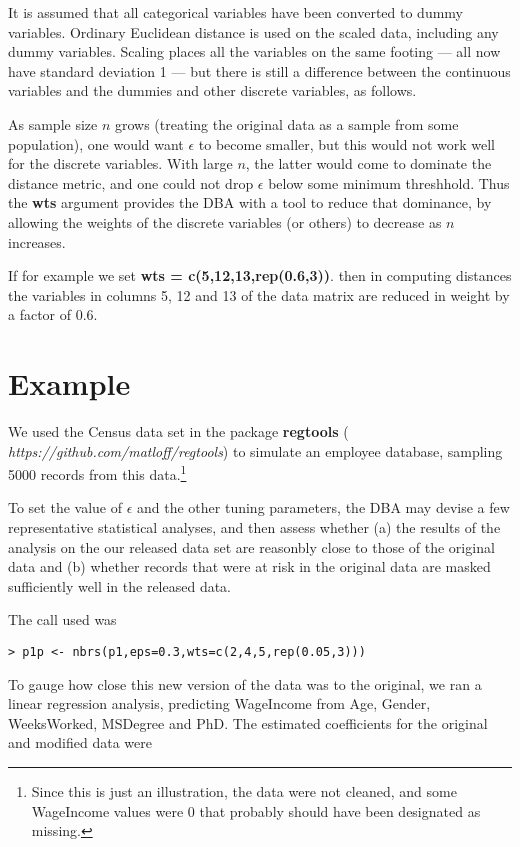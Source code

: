 \documentclass[11pt]{article}
\begin{document}
It is assumed that all categorical variables have been converted to
dummy variables.  Ordinary Euclidean distance is used on the scaled
data, including any dummy variables.  Scaling places all the variables
on the same footing --- all now have standard deviation 1 --- but there
is still a difference between the continuous variables and the dummies
and other discrete variables, as follows.

As sample size $n$ grows (treating the original data as a sample from
some population), one would want $\epsilon$ to become smaller, but this
would not work well for the discrete variables.  With large $n$, the
latter would come to dominate the distance metric, and one could not
drop $\epsilon$ below some minimum threshhold.  Thus the {\bf wts}
argument provides the DBA with a tool to reduce that dominance, by
allowing the weights of the discrete variables (or others) to decrease
as $n$ increases.

If for example we set {\bf wts = c(5,12,13,rep(0.6,3))}. then in
computing distances the variables in columns 5, 12 and 13 of the data
matrix are reduced in weight by a factor of 0.6.  

\section{Example}

We used the Census data set in the package {\bf regtools} ({\it
https://github.com/matloff/regtools}) to simulate an employee
database, sampling 5000 records from this data.\footnote{Since this is
just an illustration, the data were not cleaned, and some WageIncome
values were 0 that probably should have been designated as missing.}

To set the value of $\epsilon$ and the other tuning parameters, the DBA
may devise a few representative statistical analyses, and then assess
whether (a) the results of the analysis on the our released data set are
reasonbly close to those of the original data and (b) whether records
that were at risk in the original data are masked sufficiently well in
the released data.

The call used was

\begin{lstlisting}
> p1p <- nbrs(p1,eps=0.3,wts=c(2,4,5,rep(0.05,3)))
\end{lstlisting}

To gauge how close this new version of the data was to the original, we 
ran a linear regression analysis, predicting WageIncome from Age,
Gender, WeeksWorked, MSDegree and PhD.  The estimated coefficients
for the original and modified data were
\end{document}
